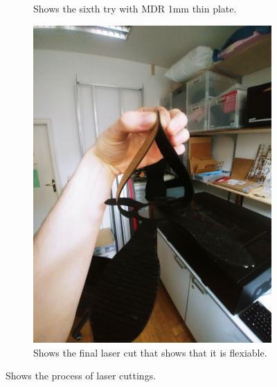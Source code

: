 \documentclass[04.3_buildingProcess.tex]{subfiles}
\begin{document}
\begin{flushleft}
\begin{figure}[H]
\begin{subfigure}{.45\textwidth}
                \caption{Shows the sixth try with MDR 1mm thin plate.}
                \label{fig:04_LaserCut}
                \vspace{6mm}
            \end{subfigure}
            \begin{subfigure}{.45\textwidth}
                \centering
                \includegraphics[width=0.65\linewidth, angle=270]{images/materialProcess/08_LaserCut.jpg}
                \caption{Shows the final laser cut that shows that it is flexiable.}
                \label{fig:08_LaserCut}
                \vspace{6mm}
            \end{subfigure}
            \caption{Shows the process of laser cuttings.}
            \label{fig:laserCutTests}
        \end{figure}
    \end{flushleft}
\end{document}

